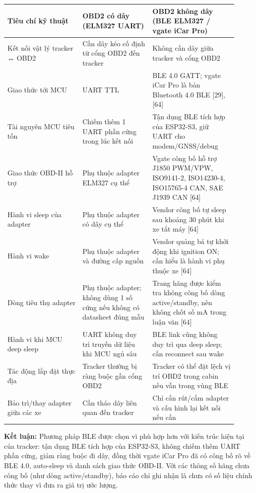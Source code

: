 \documentclass[13pt,a4paper]{extarticle}
\newcounter{none} %
\newcommand{\thesislongtableorignewline}{}
\let\thesislongtableorignewline\\
\renewcommand{\\}{\thesislongtableorignewline\hline}%
\let\\\thesislongtableorignewline
\begin{document}
{\def\LTcaptype{none} %
\begin{longtable}{|p{0.30\linewidth}|p{0.28\linewidth}|p{0.34\linewidth}|}
\hline \textbf{Tiêu chí kỹ thuật} & \textbf{OBD2 có dây (ELM327 UART)} & \textbf{OBD2 không dây (BLE
ELM327 / vgate iCar Pro)} \\
\hline
\endhead
\hline
\endlastfoot
Kết nối vật lý tracker ↔ OBD2 & Cần dây kéo cố định từ cổng OBD2 đến
tracker & Không cần dây giữa tracker và cổng OBD2 \\
Giao thức tới MCU & UART TTL & BLE 4.0 GATT; vgate iCar Pro là bản
Bluetooth 4.0 BLE {[}29{]}, {[}64{]} \\
Tài nguyên MCU tiêu tốn & Chiếm thêm 1 UART phần cứng trong lúc kết nối
& Tận dụng BLE tích hợp của ESP32-S3, giữ UART cho modem/GNSS/debug \\
Giao thức OBD-II hỗ trợ & Phụ thuộc adapter ELM327 cụ thể & Vgate công
bố hỗ trợ J1850 PWM/VPW, ISO9141-2, ISO14230-4, ISO15765-4 CAN, SAE
J1939 CAN {[}64{]} \\
Hành vi sleep của adapter & Phụ thuộc adapter có dây cụ thể & Vendor
công bố tự sleep sau khoảng 30 phút khi xe tắt máy {[}64{]} \\
Hành vi wake & Phụ thuộc adapter và đường cấp nguồn & Vendor quảng bá tự
khởi động khi ignition ON; cần hiểu là hành vi phụ thuộc xe {[}64{]} \\
Dòng tiêu thụ adapter & Phụ thuộc adapter; không dùng 1 số cứng nếu
không có datasheet đúng mẫu & Trang hãng được kiểm tra không công bố
dòng active/standby, nên không chốt số mA trong luận văn {[}64{]} \\
Hành vi khi MCU deep sleep & UART không duy trì truyền dữ liệu khi MCU
ngủ sâu & BLE link cũng không duy trì qua deep sleep; cần reconnect sau
wake \\
Tác động lắp đặt thực địa & Tracker thường bị ràng buộc gần cổng OBD2 &
Tracker có thể đặt lệch vị trí OBD2 trong cabin nếu vẫn trong vùng
BLE \\
Bảo trì/thay adapter giữa các xe & Cần tháo dây liên quan đến tracker &
Chỉ cần rút/cắm adapter và cấu hình lại kết nối nếu cần \\
\end{longtable}
}

\textbf{Kết luận:} Phương pháp BLE được chọn vì phù hợp hơn với kiến
trúc hiện tại của tracker: tận dụng BLE tích hợp của ESP32-S3, không
chiếm thêm UART phần cứng, giảm ràng buộc đi dây, đồng thời vgate iCar
Pro đã có công bố rõ về BLE 4.0, auto-sleep và danh sách giao thức
OBD-II. Với các thông số hãng chưa công bố (như dòng active/standby),
báo cáo chỉ ghi nhận là chưa có số liệu chính thức thay vì đưa ra giá
trị ước lượng.
\end{document}

